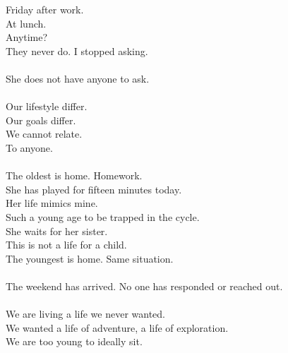 \documentclass[submission]{sffms}
\begin{document}
Friday after work. 
\ \\
At lunch. 
\ \\
Anytime? 
\ \\
They never do. I stopped asking. 
\ \\
\ \\
She does not have anyone to ask.
\ \\
\ \\
Our lifestyle differ.
\ \\
Our goals differ.
\ \\
We cannot relate.
\ \\
To anyone.
\ \\
\ \\
The oldest is home. Homework.
\ \\
She has played for fifteen minutes today. 
\ \\
Her life mimics mine. 
\ \\
Such a young age to be trapped in the cycle. 
\ \\
She waits for her sister. 
\ \\
This is not a life for a child. 
\ \\
The youngest is home. Same situation. 
\ \\
\ \\
The weekend has arrived. No one has responded or reached out. 
\ \\
\ \\
We are living a life we never wanted.
\ \\
We wanted a life of adventure, a life of exploration.
\ \\
We are too young to ideally sit.
\ \\
\end{document}
